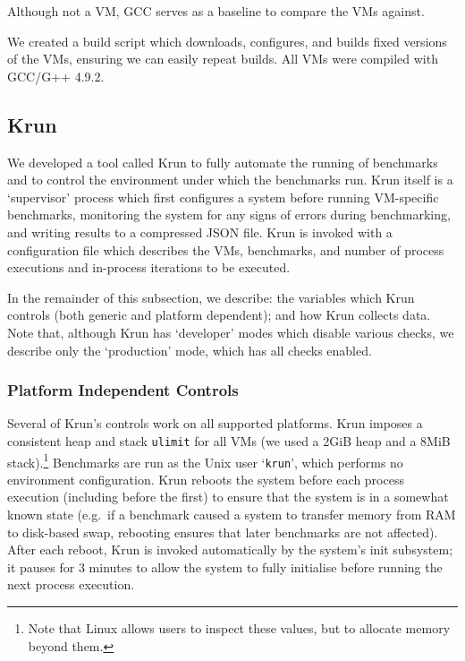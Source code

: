 \documentclass[a4paper,UKenglish]{lipics}
\newcommand{\krun}{Krun\xspace}
\begin{document}
\noindent Although not a VM, GCC serves as a baseline to compare the VMs against.

We created a build script which downloads, configures, and builds fixed
versions of the
VMs, ensuring we can easily repeat builds.
All VMs were compiled with GCC/G++ 4.9.2.


\subsection{\krun}
\label{krun}

We developed a tool called \krun to fully automate the running of benchmarks
and to control the environment under which the benchmarks run. \krun itself is a
`supervisor' process which first configures a system before running VM-specific
benchmarks, monitoring the system for any signs of errors during benchmarking,
and writing results to a compressed JSON file. \krun is invoked with a
configuration file which describes the VMs, benchmarks, and number of process
executions and in-process iterations to
be executed.

In the remainder of this subsection, we describe: the variables which \krun
controls (both generic and platform dependent); and how \krun collects data.
Note that, although \krun has `developer' modes which disable various checks,
we describe only the `production' mode, which has all checks enabled.


\subsubsection{Platform Independent Controls}

Several of \krun's controls work on all supported platforms. \krun imposes a
consistent heap and stack \texttt{ulimit} for all
VMs (we used a 2GiB heap and a 8MiB stack).\footnote{Note that Linux allows users
to inspect these values, but to allocate memory beyond them.} Benchmarks are run
as the Unix user `\texttt{krun}', which performs no environment configuration.
\krun reboots the system before each process execution (including
before the first) to ensure that the system is in a somewhat known state
(e.g.~if a benchmark caused a system to transfer memory from RAM to disk-based swap,
rebooting ensures that later benchmarks are not affected). After each reboot, \krun
is invoked automatically by the system's init subsystem; it pauses for 3 minutes to allow the system
to fully initialise before running the next process execution.
\end{document}
